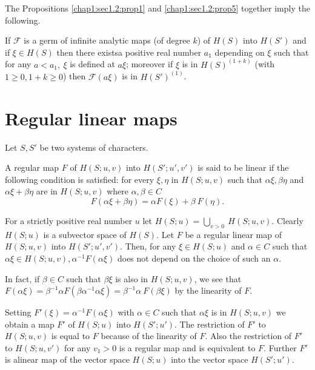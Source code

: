 The Propositions \ref{chap1:sec1.2:prop1} and \ref{chap1:sec1.2:prop5}
together imply the following. 

\begin{proposition}\label{chap1:sec1.2:prop7}%
  If $\mathscr{F}$ is a germ of infinite analytic maps (of degree $k$)
  of $H(S)$ into $H(S')$ and if $\xi \in H(S)$ then there exists\pageoriginale a
  positive real number $a_1$ depending on $\xi$ such that for any $a <
  a_1,  ~ \xi$ is defined at $a \xi$; moreover if $\xi$ is in
  $H(S)^{(1+k)}$ (with $1 \geq 0,  1 + k \geq 0$) then $\mathscr{F}
  (a\xi)$ is in $H(S')^{(1)}$.  
\end{proposition}

\section{Regular linear maps}\label{chap1:sec1.3}

Let $S,  S'$ be two systems of characters.

\begin{defi*}%
  A regular map $F$ of $H(S; u,  v)$ into $H(S'; u',  v')$ is said to
  be linear if the following condition is satisfied: for every $\xi,
  \eta$ in $H(S; u,  v)$ such that $\alpha \xi,  \beta \eta$ and
  $\alpha \xi + \beta \eta$ are in $H(S; u,  v)$ where $\alpha,  \beta
  \in C$ 
  $$
  F(\alpha \xi + \beta \eta) = \alpha F(\xi) + \beta ~ F(\eta).
  $$
\end{defi*}

For a strictly positive real number $u$ let $H(S; u) =
\bigcup\limits_{v > 0} ~ H(S; u,  v)$. Clearly $H(S; u)$ is a
subvector space of $H(S)$. Let $F$ be a regular linear map of $H(S; u,
v)$ into $H(S'; u',  v')$. Then,  for any $\xi \in H (S; u)$ and
$\alpha \in C$ such that $\alpha \xi \in H(S; u,  v),  \alpha^{-1}
F(\alpha \xi)$ does not depend on the choice of such an $\alpha$. 

In fact,  if $\beta \in C$ such that $\beta \xi$ is also in $H(S; u,
v)$,  we  see that $F(\alpha \xi) = \beta^{-1} \alpha F(\beta
\alpha^{-1} \alpha \xi) = \beta^{-1} \alpha ~ F(\beta \xi)$ by the
linearity of $F$. 

Setting $F'(\xi) = \alpha^{-1} F(\alpha \xi)$ with $\alpha \in C$ such
that $\alpha \xi$ is in $H(S; u,  v)$ we obtain a map $F'$ of $H(S;
u)$ into $H(S'; u')$. The restriction of $F'$ to $H(S; u,  v)$ is
equal to $F$ because of the linearity of $F$.  Also the restriction of
$F'$ to $H(S; u,  v')$ for any $v_1 > 0$ is a  regular map and is
equivalent to $F$. Further $F'$ is  a\pageoriginale linear map of the vector space
$H(S; u)$ into the vector space $H(S'; u')$. 

